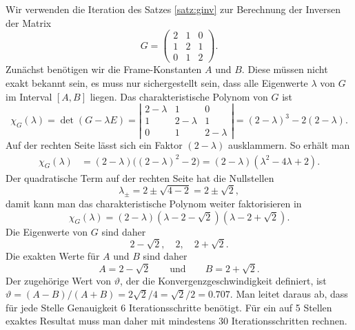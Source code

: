 \begin{beispiel}
Wir verwenden die Iteration des Satzes \ref{satz:ginv} zur Berechnung
der Inversen der Matrix
\[
G=\begin{pmatrix}2&1&0\\1&2&1\\0&1&2\end{pmatrix}.
\]
Zunächst benötigen wir die Frame-Konstanten $A$ und $B$.
Diese müssen nicht exakt bekannt sein, es muss nur sichergestellt sein,
dass alle Eigenwerte $\lambda$ von $G$ im Interval $[A,B]$ liegen.
Das charakteristische Polynom von $G$ ist
\[
\chi_{G}(\lambda)
=
\det(G-\lambda E)
=
\left|
\begin{matrix}
2-\lambda&1&0\\1&2-\lambda&1\\0&1&2-\lambda
\end{matrix}
\right|
=
(2-\lambda)^3-2(2-\lambda).
\]
Auf der rechten Seite lässt sich ein Faktor $(2-\lambda)$ ausklammern.
So erhält man
\begin{align*}
\chi_{G}(\lambda)
&=
(2-\lambda)\bigl((2-\lambda)^2-2\bigr)
=
(2-\lambda)
(\lambda^2 -4\lambda+2).
\end{align*}
Der quadratische Term auf der rechten Seite hat die Nullstellen
\[
\lambda_{\pm} = 2 \pm \sqrt{4-2} = 2 \pm\sqrt{2},
\]
damit kann man das charakteristische Polynom weiter faktorisieren
in
\[
\chi_{G}(\lambda)
=
(2-\lambda)
(\lambda -2-\sqrt{2})(\lambda -2+\sqrt{2}).
\]
Die Eigenwerte von $G$ sind daher
\[
2-\sqrt{2},\quad
2,\quad
2+\sqrt{2}.
\]
Die exakten Werte für $A$ und $B$ sind daher
\[
A=2-\sqrt{2}
\qquad\text{und}\qquad
B=2+\sqrt{2}.
\]
Der zugehörige Wert von $\vartheta$, der die Konvergenzgeschwindigkeit
definiert, ist $\vartheta = (A-B)/(A+B)=2\sqrt{2}/4=\sqrt{2}/2=0.707$.
Man leitet daraus ab, dass für jede Stelle Genauigkeit 6 Iterationsschritte
benötigt.
Für ein auf 5 Stellen exaktes Resultat muss man daher mit mindestens 30
Iterationsschritten rechnen.


\end{beispiel}
